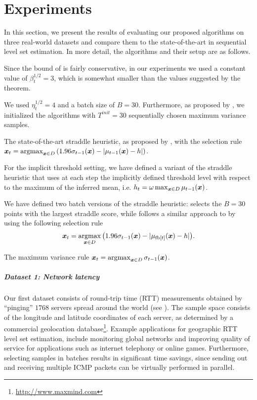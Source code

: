 \chapter{Experiments} \label{ch:exp} 
In this section, we present the results of evaluating our proposed algorithms on
three real-world datasets and compare them to the state-of-the-art in sequential
level set estimation.
In more detail, the algorithms and their setup are as follows.
\begin{description}[labelindent=0pt,leftmargin=7pt,itemindent=-2pt,itemsep=0pt]
\item[\acl/\iacl:] Since the bound of  is fairly conservative,
  in our experiments we used a constant value of $\beta_t^{1/2} = 3$, which is
  somewhat smaller than the values suggested by the theorem.
\item[\bacl/\ibacl:] We used $\eta_t^{1/2} = 4$ and a batch size of $B = 30$.
  Furthermore, as proposed by \citet{desautels12}, we initialized the
  algorithms with $T^{init} = 30$ sequentially chosen maximum variance samples.
\item[\str:] The state-of-the-art straddle heuristic,
  as proposed by \citet{bryan05}, with the selection rule
  ${\*x_t = \argmax_{\*x \in D} \left(1.96\sigma_{t-1}(\*x) - |\mu_{t-1}(\*x) - h|\right)}$.
\item[\istr:] For the implicit threshold setting, we have defined a
  variant of the straddle heuristic that uses at each step the
  implicitly defined threshold level with respect to the maximum of the
  inferred mean, i.e.
  ${h_t = \omega \max_{\bm{x}\in D} \mu_{t-1}(\bm{x})}$.
\item[\rstr/\bstr:] We have defined two batch versions of the straddle heuristic:
  \rstr selects the $B = 30$ points with
  the largest straddle score, while \bstr follows a similar approach to \bacl
  by using the following selection rule
  \begin{align*}
  {\*x_t = \argmax_{\*x \in D}\left(1.96\sigma_{t-1}(\*x) - |\mu_{\fb[t]}(\*x) - h|\right)}.
  \end{align*}
\item[\var:]  The maximum variance rule
  $\*x_t = \argmax_{\*x \in D} \sigma_{t-1}(\*x)$.
\end{description}

\paragraph{Dataset 1: Network latency}
Our first dataset consists of round-trip time (RTT) measurements obtained
by ``pinging'' $1768$ servers spread around the world (see ).
The sample space consists of the longitude and latitude coordinates of each
server, as determined by a commercial geolocation
database\footnote{\url{http://www.maxmind.com}}.
Example applications for geographic RTT level set estimation, include
monitoring global networks and improving quality of service for applications
such as internet telephony or online games. Furthermore,
selecting samples in batches results in significant time savings, since
sending out and receiving multiple ICMP packets can be virtually performed in
parallel.

